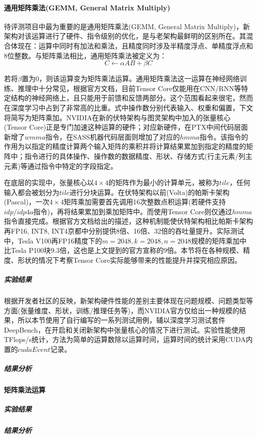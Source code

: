 \paragraph{通用矩阵乘法(GEMM, General Matrix Multiply)}
\par 待评测项目中最为重要的是通用矩阵乘法(GEMM, General Matrix Multiply)，新架构对该运算进行了硬件、指令级别的优化，是与老架构最鲜明的区别所在。其混合体现在：运算中同时有加法和乘法，且精度同时涉及半精度浮点、单精度浮点和8位整数。与矩阵乘法相比，通用矩阵乘法被定义为：
$$ C \leftarrow \alpha AB + \beta C $$
\par 若将$ \beta $置为0，则该运算变为矩阵乘法运算。通用矩阵乘法这一运算在神经网络训练、推理中十分常见，根据官方文档，目前Tensor Core仅能用在CNN/RNN等特定结构的神经网络上，且只能用于前馈和反馈两部分。这个范围看起来很宅，然而在深度学习中占到了非常高的比重。式中操作数分别代表输入、权重和偏置，下文将简写为矩阵乘加。NVIDIA在新的伏特架构与图灵架构中加入的张量核心(Tensor Core)正是专门加速这种运算的硬件；对应新硬件，在PTX中间代码层面新增了$ wmma $指令，在SASS机器代码层面则增加了对应的$ hmma $指令。该指令的作用为以指定的精度计算两个输入矩阵的乘积并将计算结果累加到指定的精度的矩阵中；指令进行的具体操作、操作数的数据精度、形状、存储方式(行主元素/列主元素)等通过指令中特定的字段指定。
\par 在底层的实现中，张量核心以$ 4 \times 4 $的矩阵作为最小的计算单元，被称为$ tile $，任何输入都会被划分为$ tile $进行分块运算。在伏特架构以前(Volta)的帕斯卡架构(Pascal)，一次$ 4 \times 4 $矩阵乘加需要首先调用16次整数点积运算(若硬件支持$ idp/idp4a $指令)，再将结果累加到乘加矩阵中。而使用Tensor Core则仅通过$ hmma $指令直接完成。根据官方文档给出的描述，这种机制能使伏特架构相比帕斯卡架构再FP16, INT8, INT4京都中分别提供8倍、16倍、32倍的吞吐量提升。实际测试中，Tesla V100再FP16精度下的$ m=2048, k=2048, n = 2048 $规模的矩阵乘加中比Tesla P100块9.3倍\parencite{VOLTAWHITEPAPER}，这也是上文提到的官方宣称的9倍。本节将在各种规模、精度、形状的情况下考察Tensor Core实际能够带来的性能提升并探究相应原因。
\subparagraph{实验结果}
\par 根据开发者社区的反映，新架构硬件性能的差别主要体现在问题规模、问题类型等方面(张量维度、形状，训练/推理任务等)，而NVIDIA官方仅给出一种规模的结果，所以本节使用了自行编写的一系列测试用例，辅以深度学习测试套件DeepBench，在开启和关闭新架构中张量核心的情况下进行测试。实验性能使用TFlops/s统计，方法为简单的运算数除以运算时间，运算时间的统计采用CUDA内置的$ cudaEvent $记录。
\subparagraph{结果分析}
\paragraph{矩阵乘法运算}
\subparagraph{实验结果}
\subparagraph{结果分析}
